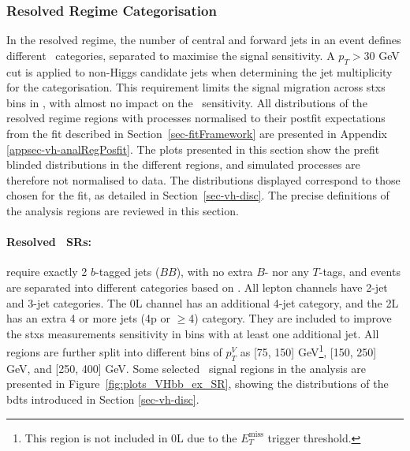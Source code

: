 \subsubsection{Resolved Regime Categorisation}
In the resolved regime, the number of central and forward jets in an event defines different \nj\ categories, separated to maximise the signal sensitivity. A $p_T > 30$ GeV cut is applied to non-Higgs candidate jets when determining the jet multiplicity for the categorisation. This requirement limits the signal migration across \gls{stxs} bins in \vhb, with almost no impact on the \vhc\ sensitivity. All distributions of the resolved regime regions with processes normalised to their postfit expectations from the fit described in Section~\ref{sec-fitFramework} are presented in Appendix \ref{appsec-vh-analRegPosfit}. The plots presented in this section show the prefit blinded distributions in the different regions, and simulated processes are therefore not normalised to data. The distributions displayed correspond to those chosen for the fit, as detailed in Section~\ref{sec-vh-disc}. The precise definitions of the analysis regions are reviewed in this section.

\paragraph{Resolved \boldvhb\ SRs:} require exactly 2 $b$-tagged jets ($BB$), with no extra $B$- nor any $T$-tags, and events are separated into different categories based on \nj. All lepton channels have 2-jet and 3-jet categories. The 0L channel has an additional 4-jet category, and the 2L has an extra 4 or more jets (4p or $\geq$4) category. They are included to improve the \gls{stxs} measurements sensitivity in bins with at least one additional jet. All regions are further split into different bins of $p_T^V$ as [75, 150] GeV\footnote{This region is not included in 0L due to the $E_T^{\textrm{miss}}$ trigger threshold.}, [150, 250] GeV, and [250, 400] GeV. Some selected \vhb\ signal regions in the analysis are presented in Figure~\ref{fig:plots_VHbb_ex_SR}, showing the distributions of the \glspl{bdt} introduced in Section \ref{sec-vh-disc}. 

